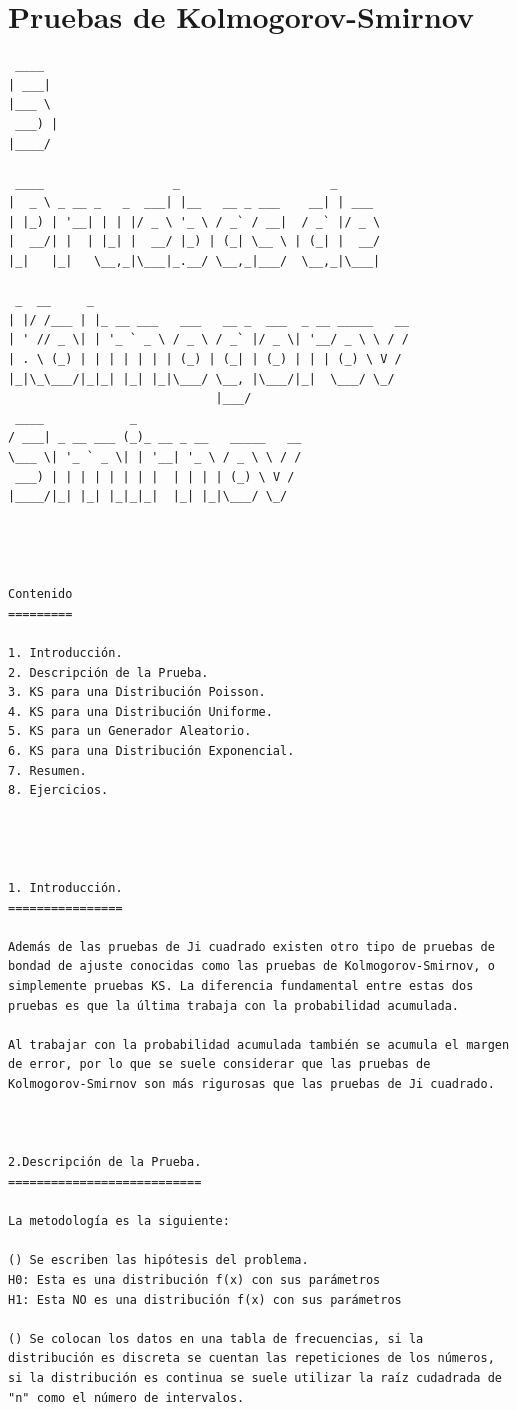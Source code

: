 \chapter{Pruebas de Kolmogorov-Smirnov}
\begin{verbatim}
 ____
| ___|
|___ \
 ___) |
|____/

 ____                  _                     _
|  _ \ _ __ _   _  ___| |__   __ _ ___    __| | ___
| |_) | '__| | | |/ _ \ '_ \ / _` / __|  / _` |/ _ \
|  __/| |  | |_| |  __/ |_) | (_| \__ \ | (_| |  __/
|_|   |_|   \__,_|\___|_.__/ \__,_|___/  \__,_|\___|

 _  __     _
| |/ /___ | |_ __ ___   ___   __ _  ___  _ __ _____   __
| ' // _ \| | '_ ` _ \ / _ \ / _` |/ _ \| '__/ _ \ \ / /
| . \ (_) | | | | | | | (_) | (_| | (_) | | | (_) \ V /
|_|\_\___/|_|_| |_| |_|\___/ \__, |\___/|_|  \___/ \_/
                             |___/
 ____            _
/ ___| _ __ ___ (_)_ __ _ __   _____   __
\___ \| '_ ` _ \| | '__| '_ \ / _ \ \ / /
 ___) | | | | | | | |  | | | | (_) \ V /
|____/|_| |_| |_|_|_|  |_| |_|\___/ \_/




Contenido
=========

1. Introducción.
2. Descripción de la Prueba.
3. KS para una Distribución Poisson.
4. KS para una Distribución Uniforme.
5. KS para un Generador Aleatorio.
6. KS para una Distribución Exponencial.
7. Resumen.
8. Ejercicios.




1. Introducción.
================

Además de las pruebas de Ji cuadrado existen otro tipo de pruebas de bondad de ajuste conocidas como las pruebas de Kolmogorov-Smirnov, o simplemente pruebas KS. La diferencia fundamental entre estas dos pruebas es que la última trabaja con la probabilidad acumulada.

Al trabajar con la probabilidad acumulada también se acumula el margen de error, por lo que se suele considerar que las pruebas de Kolmogorov-Smirnov son más rigurosas que las pruebas de Ji cuadrado.



2.Descripción de la Prueba.
===========================

La metodología es la siguiente:

() Se escriben las hipótesis del problema.
H0: Esta es una distribución f(x) con sus parámetros
H1: Esta NO es una distribución f(x) con sus parámetros

() Se colocan los datos en una tabla de frecuencias, si la distribución es discreta se cuentan las repeticiones de los números, si la distribución es continua se suele utilizar la raíz cudadrada de "n" como el número de intervalos. 


\end{verbatim}
